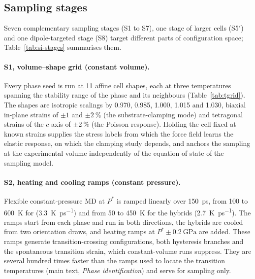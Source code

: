 \subsection{Sampling stages}
\label{sec:configgen:stages}

Seven complementary sampling stages (S1 to S7), one stage of larger cells (S5$'$) and one
dipole-targeted stage (S8) target different parts of configuration space; Table~\ref{tab:si-stages}
summarises them.

\paragraph{S1, volume--shape grid (constant volume).} Every phase seed is run at 11 affine cell shapes,
each at three temperatures spanning the stability range of the phase and its neighbours
(Table~\ref{tab:tgrid}). The shapes are isotropic scalings by 0.970, 0.985, 1.000, 1.015 and 1.030,
biaxial in-plane strains of $\pm1$ and $\pm\SI{2}{\percent}$ (the substrate-clamping mode) and
tetragonal strains of the $c$ axis of $\pm\SI{2}{\percent}$ (the Poisson response). Holding the cell
fixed at known strains supplies the stress labels from which the force field learns the elastic
response, on which the clamping study depends, and anchors the sampling at the experimental volume
independently of the equation of state of the sampling model.

\paragraph{S2, heating and cooling ramps (constant pressure).} Flexible constant-pressure MD at
$P^\ast$ is ramped linearly over \SI{150}{\pico\second}, from 100 to \SI{600}{\kelvin} for \CsSnI{}
(\SI{3.3}{\kelvin\per\pico\second}) and from 50 to \SI{450}{\kelvin} for the hybrids
(\SI{2.7}{\kelvin\per\pico\second}). The ramps start from each phase and run in both directions, the
hybrids are cooled from two orientation draws, and heating ramps at $P^\ast\pm\SI{0.2}{\giga\pascal}$
are added. These ramps generate transition-crossing configurations, both hysteresis branches and the
spontaneous transition strain, which constant-volume runs suppress. They are several hundred times
faster than the ramps used to locate the transition temperatures (main text, \emph{Phase
identification}) and serve for sampling only.


